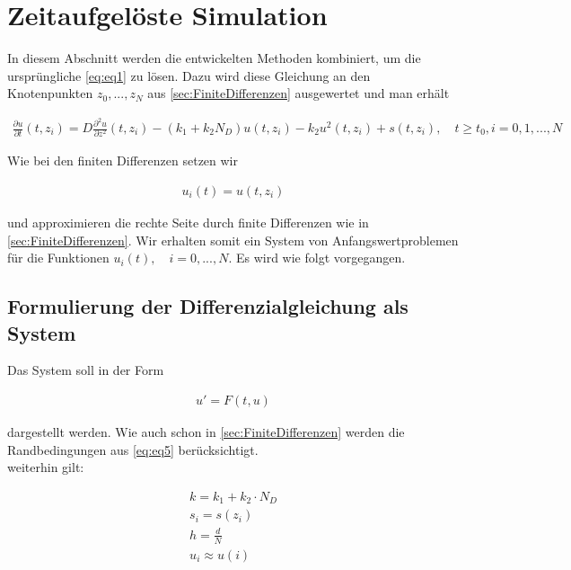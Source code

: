 \documentclass[
	pagesize,
	fontsize=12pt,
	paper=a4,
	oneside,
   reqno
]{scrartcl}
\begin{document}
\clearpage

\section{Zeitaufgelöste Simulation} \label{sec:ZeitaufgeloesteSimulation}

In diesem Abschnitt werden die entwickelten Methoden kombiniert, um die ursprüngliche \autoref{eq:eq1} zu lösen. Dazu wird diese Gleichung an den Knotenpunkten $z_0, ... ,z_N$ aus \autoref{sec:FiniteDifferenzen} ausgewertet und man erhält

\begin{align*}
   \frac{\partial u}{\partial t}(t,z_i) = D\frac{\partial ^2u}{\partial z^2}(t,z_i) - (k_1 + k_2N_D)u(t,z_i) - k_2u^2(t,z_i) + s(t,z_i), \quad t \geq t_0,i = 0,1,...,N
\end{align*}

Wie bei den finiten Differenzen setzen wir

\begin{align*}
   u_i(t) = u(t,z_i)
\end{align*}

und approximieren die rechte Seite durch finite Differenzen wie in \autoref{sec:FiniteDifferenzen}. Wir erhalten somit ein System von Anfangswertproblemen für die Funktionen $u_i(t), \quad i = 0,...,N$. Es wird wie folgt vorgegangen.

\subsection{Formulierung der Differenzialgleichung als System}

Das System soll in der Form 

\begin{align}
   \label{eq:eq8}
   u' = F(t,u)
\end{align}

dargestellt werden. Wie auch schon in \autoref{sec:FiniteDifferenzen} werden die Randbedingungen  aus \autoref{eq:eq5} berücksichtigt. \\

weiterhin gilt:

\begin{align*}
   k = k_1+k_2\cdot N_D \\
   s_i = s(z_i) \\
   h = \frac{d}{N} \\
   u_i \approx u(i)
\end{align*}
\end{document}
